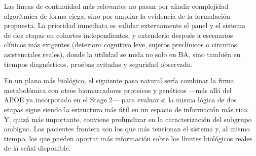 Las líneas de continuidad más relevantes no pasan por añadir complejidad algorítmica de forma ciega, sino por ampliar la evidencia de la formulación propuesta. La prioridad inmediata es validar externamente el panel y el sistema de dos etapas en cohortes independientes, y extenderlo después a escenarios clínicos más exigentes (deterioro cognitivo leve, sujetos preclínicos o circuitos asistenciales reales), donde la utilidad se mida no solo en BA, sino también en tiempos diagnósticos, pruebas evitadas y seguridad observada.

En un plano más biológico, el siguiente paso natural sería combinar la firma metabolómica con otros biomarcadores proteicos y genéticos ---más allá del APOE ya incorporado en el Stage 2--- para evaluar si la misma lógica de dos etapas sigue siendo la estructura más útil en un espacio de información más rico. Y, quizá más importante, conviene profundizar en la caracterización del subgrupo ambiguo. Los pacientes frontera son los que más tensionan el sistema y, al mismo tiempo, los que pueden aportar más información sobre los límites biológicos reales de la señal disponible.